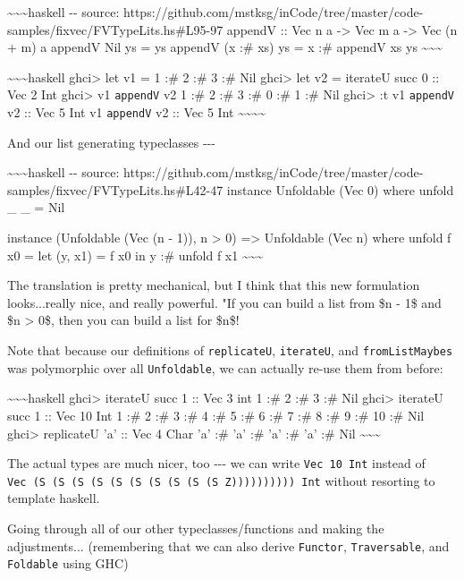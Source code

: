 \documentclass[]{article}
\begin{document}
\textasciitilde{}\textasciitilde{}\textasciitilde{}haskell -\/- source:
https://github.com/mstksg/inCode/tree/master/code-samples/fixvec/FVTypeLits.hs\#L95-97
appendV :: Vec n a -\textgreater{} Vec m a -\textgreater{} Vec (n + m) a appendV
Nil ys = ys appendV (x :\# xs) ys = x :\# appendV xs ys
\textasciitilde{}\textasciitilde{}\textasciitilde{}

\textasciitilde{}\textasciitilde{}\textasciitilde{}haskell ghci\textgreater{}
let v1 = 1 :\# 2 :\# 3 :\# Nil ghci\textgreater{} let v2 = iterateU succ 0 ::
Vec 2 Int ghci\textgreater{} v1 \texttt{appendV} v2 1 :\# 2 :\# 3 :\# 0 :\# 1
:\# Nil ghci\textgreater{} :t v1 \texttt{appendV} v2 :: Vec 5 Int v1
\texttt{appendV} v2 :: Vec 5 Int
\textasciitilde{}\textasciitilde{}\textasciitilde{}\textasciitilde{}

And our list generating typeclasses -\/-\/-

\textasciitilde{}\textasciitilde{}\textasciitilde{}haskell -\/- source:
https://github.com/mstksg/inCode/tree/master/code-samples/fixvec/FVTypeLits.hs\#L42-47
instance Unfoldable (Vec 0) where unfold \_ \_ = Nil

instance (Unfoldable (Vec (n - 1)), n \textgreater{} 0) =\textgreater{}
Unfoldable (Vec n) where unfold f x0 = let (y, x1) = f x0 in y :\# unfold f x1
\textasciitilde{}\textasciitilde{}\textasciitilde{}

The translation is pretty mechanical, but I think that this new formulation
looks...really nice, and really powerful. "If you can build a list from \$n -
1\$ and \$n \textgreater{} 0\$, then you can build a list for \$n\$!

Note that because our definitions of \texttt{replicateU}, \texttt{iterateU}, and
\texttt{fromListMaybes} was polymorphic over all \texttt{Unfoldable}, we can
actually re-use them from before:

\textasciitilde{}\textasciitilde{}\textasciitilde{}haskell ghci\textgreater{}
iterateU succ 1 :: Vec 3 int 1 :\# 2 :\# 3 :\# Nil ghci\textgreater{} iterateU
succ 1 :: Vec 10 Int 1 :\# 2 :\# 3 :\# 4 :\# 5 :\# 6 :\# 7 :\# 8 :\# 9 :\# 10
:\# Nil ghci\textgreater{} replicateU 'a' :: Vec 4 Char 'a' :\# 'a' :\# 'a' :\#
'a' :\# Nil \textasciitilde{}\textasciitilde{}\textasciitilde{}

The actual types are much nicer, too -\/-\/- we can write \texttt{Vec\ 10\ Int}
instead of
\texttt{Vec\ (S\ (S\ (S\ (S\ (S\ (S\ (S\ (S\ (S\ (S\ Z))))))))))\ Int} without
resorting to template haskell.

Going through all of our other typeclasses/functions and making the
adjustments... (remembering that we can also derive \texttt{Functor},
\texttt{Traversable}, and \texttt{Foldable} using GHC)
\end{document}

